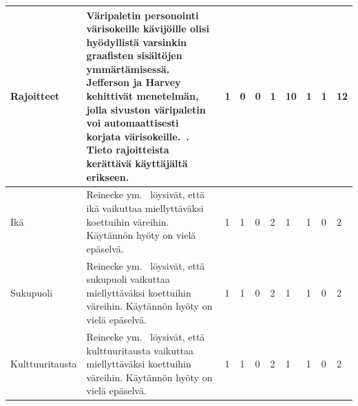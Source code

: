 \documentclass[finnish, 12pt, a4paper, elec, utf8, a-1b, online]{aaltothesis}
\begin{document}
{\begin{longtable}{p{2.5cm}|p{6cm}|p{0.5cm}p{0.5cm}p{0.5cm}|p{0.5cm}|p{0.5cm}p{0.5cm}p{0.5cm}|p{0.5cm}|}
    \midrule
    Rajoitteet                             & Väripaletin personointi värisokeille kävijöille olisi hyödyllistä varsinkin graafisten sisältöjen ymmärtämisessä. Jefferson ja Harvey kehittivät menetelmän, jolla sivuston väripaletin voi automaattisesti korjata värisokeille.~\cite{10.1145/1168987.1168996}. Tieto rajoitteista kerättävä käyttäjältä erikseen. & 1                                          & 0                                   & 0                                      & 1                            & 10                                              & 1                                         & 1                                         & 12                           \\
    \midrule
    Ikä                                    & Reinecke ym.~\cite{10.1145/2556288.2557052} löysivät, että ikä vaikuttaa miellyttäväksi koettuihin väreihin. Käytännön hyöty on vielä epäselvä.                                                                                                                                                                      & 1                                          & 1                                   & 0                                      & 2                            & 1                                               & 1                                         & 0                                         & 2                            \\
    \midrule
    Sukupuoli                              & Reinecke ym.~\cite{10.1145/2556288.2557052} löysivät, että sukupuoli vaikuttaa miellyttäväksi koettuihin väreihin. Käytännön hyöty on vielä epäselvä.                                                                                                                                                                & 1                                          & 1                                   & 0                                      & 2                            & 1                                               & 1                                         & 0                                         & 2                            \\
    \midrule
    Kulttuuritausta                        & Reinecke ym.~\cite{10.1145/2556288.2557052} löysivät, että kulttuuritausta vaikuttaa miellyttäväksi koettuihin väreihin. Käytännön hyöty on vielä epäselvä.                                                                                                                                                          & 1                                          & 1                                   & 0                                      & 2                            & 1                                               & 1                                         & 0                                         & 2                            \\

\end{longtable}}
\end{document}
